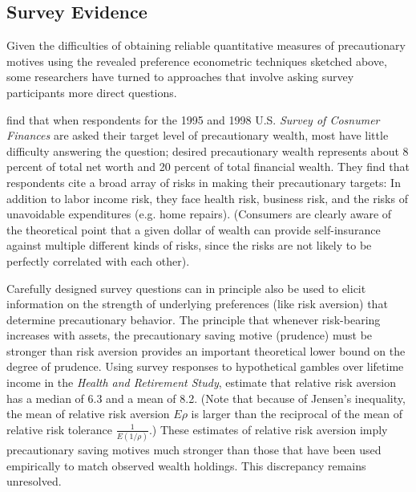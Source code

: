 \subsection{Survey Evidence}

Given the difficulties of obtaining reliable quantitative measures 
of precautionary motives using the revealed preference econometric
techniques sketched above, some researchers have turned to
approaches that involve asking survey participants more direct questions.

\cite{KennickellLusardiDisentangling} find that when respondents for
the 1995 and 1998 U.S. {\it Survey of Cosnumer Finances} are asked
their target level of precautionary wealth, most have little
difficulty answering the question; desired precautionary wealth
represents about 8 percent of total net worth and 20 percent of total
financial wealth.  They find that respondents cite a broad array of
risks in making their precautionary targets: In addition to labor
income risk, they face health risk, business risk, and the risks of
unavoidable expenditures (e.g. home repairs).  (Consumers are clearly
aware of the theoretical point that a given dollar of wealth can
provide self-insurance against multiple different kinds of risks,
since the risks are not likely to be perfectly correlated with each
other).

Carefully designed survey questions can in principle also be used to
elicit information on the strength of underlying preferences (like
risk aversion) that determine precautionary behavior.  The principle
that whenever risk-bearing increases with assets, the precautionary
saving motive (prudence) must be stronger than risk aversion provides
an important theoretical lower bound on the degree of prudence.
Using survey responses to hypothetical gambles over lifetime income in the
{\em Health and Retirement Study}, \cite{kssImputing} estimate that
relative risk aversion has a median of 6.3 and a mean of 8.2.  (Note
that because of Jensen's inequality, the mean of relative risk
aversion $E \rho$ is larger than the reciprocal of the mean of
relative risk tolerance $\frac{1}{E(1/\rho)}$.)  These estimates of
relative risk aversion imply precautionary saving motives much
stronger than those that have been used empirically to match observed
wealth holdings.  This discrepancy remains
unresolved.




